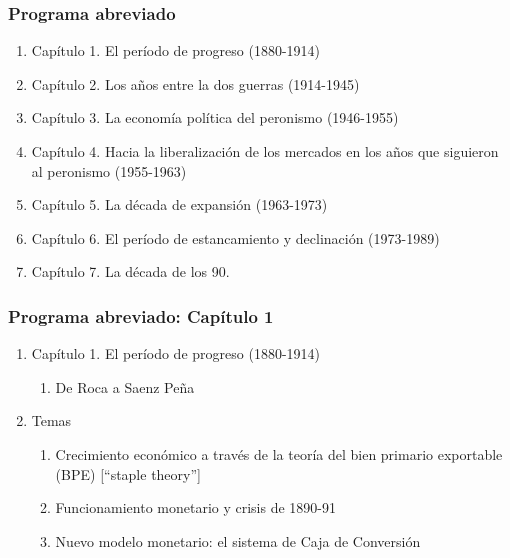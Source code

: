 \documentclass[14pt,aspectratio=169]{beamer}
\begin{document}
  
   \begin{frame}\frametitle{Programa abreviado}
     \begin{enumerate}
     \item Capítulo 1. El período de progreso (1880-1914)
     \item Capítulo 2. Los años entre la dos guerras (1914-1945)
       \item Capítulo 3. La economía política del peronismo
         (1946-1955)
         \item Capítulo 4. Hacia la liberalización de los mercados en
           los años que siguieron al peronismo (1955-1963)
         \item Capítulo 5. La década de expansión (1963-1973)
           \item Capítulo 6. El período de estancamiento y declinación
             (1973-1989)
             \item Capítulo 7. La década de los 90. 
       \end{enumerate}
  \end{frame}


  \begin{frame}\frametitle{Programa abreviado: Capítulo 1}
     \begin{enumerate}
     \item Capítulo 1. El período de progreso (1880-1914)
       \begin{enumerate}
       \item De Roca a Saenz Peña
         \end{enumerate}
       \item Temas
         \begin{enumerate}
           \item Crecimiento económico a través de la teoría del bien
             primario exportable (BPE) [``staple theory'']
           \item Funcionamiento monetario y crisis de 1890-91
             \item Nuevo modelo monetario: el sistema de Caja de Conversión
             \end{enumerate}
             \end{enumerate}
  \end{frame}
\end{document}
